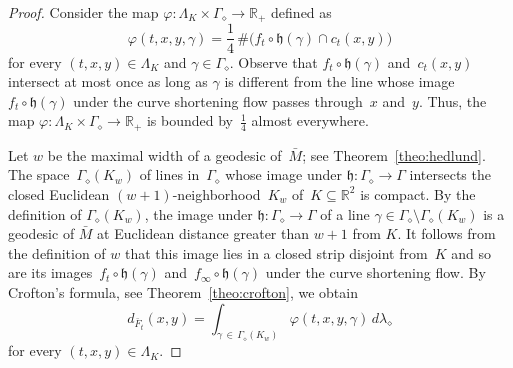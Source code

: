 \documentclass[AHL,Unicode,longabstracts,published]{cedram}
\newcommand{\R}{\mathbb{R}}
\newcommand{\bh}{\mathfrak{h}}
\begin{document}
\begin{proof}
Consider the map $\varphi: \Lambda_K \times \Gamma_\diamond \to \R_+$ defined as
\[
\varphi(t,x,y,\gamma) = \frac{1}{4} \, \#\big(f_t \circ \bh(\gamma) \cap c_t(x,y)\big)
\]
for every $(t,x,y) \in \Lambda_K$ and $\gamma \in \Gamma_\diamond$. Observe that $f_t \circ \bh(\gamma)$ and~$c_t(x,y)$ intersect at most once as long as $\gamma$ is different from the line whose image $f_t \circ \bh(\gamma)$ under the curve shortening flow passes through~$x$ and~$y$. Thus, the map $\varphi : \Lambda_K \times \Gamma_\diamond \to \R_+$ is bounded by~$\frac{1}{4}$ almost everywhere.

Let $w$ be the maximal width of a geodesic of~$\bar{M}$; see Theorem~\ref{theo:hedlund}. The space~$\Gamma_\diamond(K_w)$ of lines in~$\Gamma_\diamond$ whose image under $\bh:\Gamma_\diamond \to \Gamma$ intersects the closed Euclidean $(w+1)$-neighborhood~$K_w$ of~$K \subseteq \R^2$ is compact. By the definition of $\Gamma_{\diamond}(K_{w})$, the image under $\bh:\Gamma_{\diamond}\to\Gamma$ of a line $\gamma\in\Gamma_{\diamond}\setminus\Gamma_{\diamond}(K_{w})$ is a geodesic of $\bar{M}$ at Euclidean distance greater than $w+1$ from $K$. It follows from the definition of $w$ that this image lies in a closed strip disjoint from~$K$ and so are its images~$f_t \circ \bh(\gamma)$ and~$f_\infty \circ \bh(\gamma)$ under the curve shortening flow. By Crofton's formula, see Theorem~\ref{theo:crofton}, we obtain
\begin{equation}\label{eq:integral}
d_{\bar{F}_t}(x,y) = \int_{\gamma\,\in\,\Gamma_\diamond(K_w)} \varphi(t,x,y,\gamma) \, d\lambda_\diamond
\end{equation}
for every $(t,x,y) \in \Lambda_K$.



\end{proof}
\end{document}
